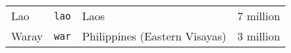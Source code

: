 \begin{table}[ht]
\begin{tabular}{p{2cm}p{1.6cm}p{4.8cm}p{2.5cm}}
Lao               & \texttt{lao}       & Laos                               & 7 million                                              \\ 
Waray             & \texttt{war}      & Philippines (Eastern Visayas)      & 3 million                                              \\
\bottomrule
\end{tabular}
\end{table}

